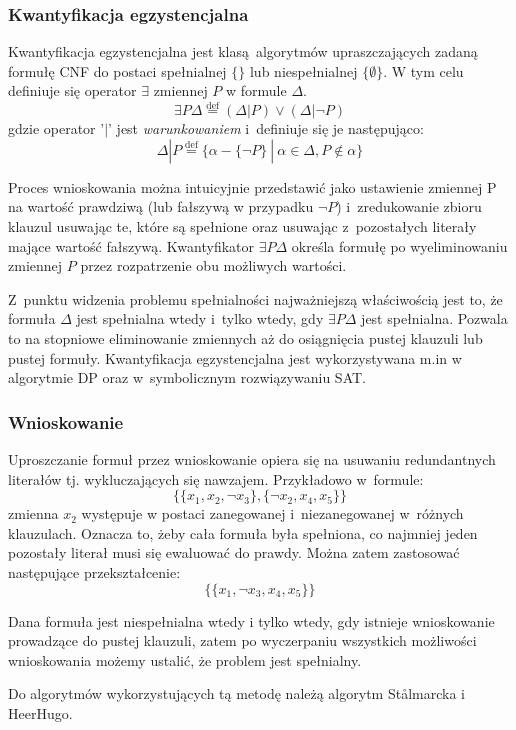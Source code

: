 \subsubsection{Kwantyfikacja egzystencjalna}
Kwantyfikacja egzystencjalna jest klasą algorytmów upraszczających zadaną formułę CNF do postaci spełnialnej $\{\}$ lub niespełnialnej $\{\emptyset\}$.
W tym celu definiuje się operator $\exists$ zmiennej $P$ w formule $\Delta$.
\[ \exists P \Delta \stackrel{\text{def}}{=} (\Delta | P) \lor (\Delta | \neg P) \]
gdzie operator '$|$' jest \textit{warunkowaniem} i~definiuje się je następująco:
\[ \Delta | P \stackrel{\text{def}}{=} \{\alpha - \{\neg P\}~|~\alpha \in \Delta, P \notin \alpha\} \]

Proces wnioskowania można intuicyjnie przedstawić jako ustawienie zmiennej P na wartość prawdziwą (lub fałszywą w przypadku $\neg P$)
i~zredukowanie zbioru klauzul usuwając te, które są spełnione oraz usuwając z~pozostałych literały mające wartość fałszywą.
Kwantyfikator $\exists P \Delta $ określa formułę po wyeliminowaniu zmiennej $P$ przez rozpatrzenie obu możliwych wartości.

Z~punktu widzenia problemu spełnialności najważniejszą właściwością jest to, że formuła $\Delta$ jest spełnialna wtedy i~tylko wtedy, gdy 
$\exists P \Delta$ jest spełnialna. Pozwala to na stopniowe eliminowanie zmiennych aż do osiągnięcia pustej klauzuli lub pustej formuły. 
Kwantyfikacja egzystencjalna jest wykorzystywana m.in w algorytmie DP oraz w~symbolicznym rozwiązywaniu SAT.

\subsubsection{Wnioskowanie}
Uproszczanie formuł przez wnioskowanie opiera się na usuwaniu redundantnych literałów tj. wykluczających się nawzajem.
Przykładowo w~formule:
\[ \{\{x_1, x_2, \neg x_3 \},  \{ \neg x_2, x_4, x_5 \}\} \]
zmienna $x_2$ występuje w postaci zanegowanej i~niezanegowanej w~różnych klauzulach. Oznacza to, żeby cała formuła była spełniona,
co najmniej jeden pozostały literał musi się ewaluować do prawdy. Można zatem zastosować następujące przekształcenie:
  \[ \{\{x_1, \neg x_3, x_4, x_5 \}\} \]
  
Dana formuła jest niespełnialna wtedy i tylko wtedy, gdy istnieje wnioskowanie prowadzące do pustej klauzuli, zatem po wyczerpaniu
wszystkich możliwości wnioskowania możemy ustalić, że problem jest spełnialny. 

Do algorytmów wykorzystujących tą metodę należą algorytm St{\aa}lmarcka i HeerHugo.

